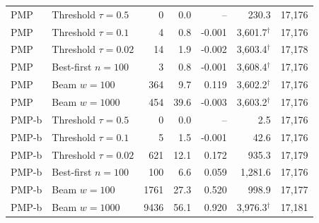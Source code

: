 \documentclass[11pt,a4paper]{article}
\begin{document}
\begin{table}[h]
\begin{tabular}{llrrrrr}
\quad PMP & Threshold $\tau{=}0.5$ & 0 & 0.0 & -- & 230.3 & 17,176 \\
\quad PMP & Threshold $\tau{=}0.1$ & 4 & 0.8 & -0.001 & 3,601.7$^{\dagger}$ & 17,176 \\
\quad PMP & Threshold $\tau{=}0.02$ & 14 & 1.9 & -0.002 & 3,603.4$^{\dagger}$ & 17,178 \\
\quad PMP & Best-first $n{=}100$ & 3 & 0.8 & -0.001 & 3,608.4$^{\dagger}$ & 17,176 \\
\quad PMP & Beam $w{=}100$ & 364 & 9.7 & 0.119 & 3,602.2$^{\dagger}$ & 17,176 \\
\quad PMP & Beam $w{=}1000$ & 454 & 39.6 & -0.003 & 3,603.2$^{\dagger}$ & 17,176 \\
\quad PMP-b & Threshold $\tau{=}0.5$ & 0 & 0.0 & -- & 2.5 & 17,176 \\
\quad PMP-b & Threshold $\tau{=}0.1$ & 5 & 1.5 & -0.001 & 42.6 & 17,176 \\
\quad PMP-b & Threshold $\tau{=}0.02$ & 621 & 12.1 & 0.172 & 935.3 & 17,179 \\
\quad PMP-b & Best-first $n{=}100$ & 100 & 6.6 & 0.059 & 1,281.6 & 17,176 \\
\quad PMP-b & Beam $w{=}100$ & 1761 & 27.3 & 0.520 & 998.9 & 17,177 \\
\quad PMP-b & Beam $w{=}1000$ & 9436 & 56.1 & 0.920 & 3,976.3$^{\dagger}$ & 17,181 \\
\bottomrule
\end{tabular}
\end{table}
\end{document}
